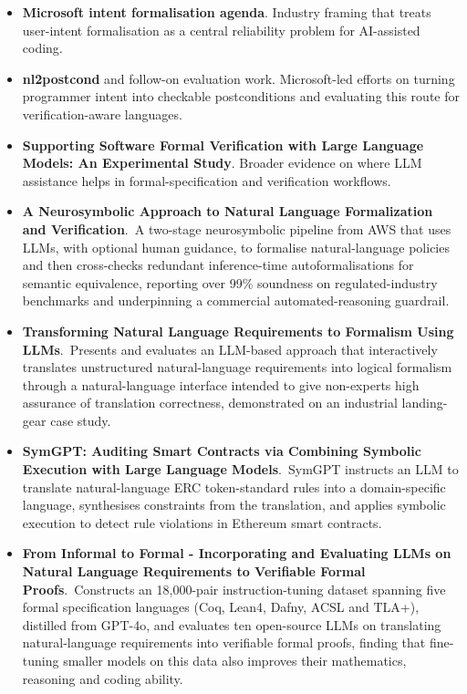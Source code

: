 \documentclass[natbib=false,acmsmall,nonacm,11pt]{acmart}
\begin{document}
\begin{itemize}
\item \textbf{Microsoft intent formalisation agenda}. Industry framing that treats user-intent formalisation as a central reliability problem for AI-assisted coding.~\cite{intent_formalization_grand_challenge_project}
\item \textbf{nl2postcond} and follow-on evaluation work. Microsoft-led efforts on turning programmer intent into checkable postconditions and evaluating this route for verification-aware languages.~\cite{DBLP:journals/pacmse/EndresFCL24,DBLP:conf/fmcad/Lahiri24}
\item \textbf{Supporting Software Formal Verification with Large Language Models: An Experimental Study}. Broader evidence on where LLM assistance helps in formal-specification and verification workflows.~\cite{DBLP:journals/corr/abs-2507-04857}
\item \textbf{A Neurosymbolic Approach to Natural Language Formalization and Verification}.~A two-stage neurosymbolic pipeline from AWS that uses LLMs, with optional human guidance, to formalise natural-language policies and then cross-checks redundant inference-time autoformalisations for semantic equivalence, reporting over 99\% soundness on regulated-industry benchmarks and underpinning a commercial automated-reasoning guardrail.~\cite{DBLP:conf/cav/AnBBCCCDDEFGGGHHHJKKKLL26}
\item \textbf{Transforming Natural Language Requirements to Formalism Using LLMs}.~Presents and evaluates an LLM-based approach that interactively translates unstructured natural-language requirements into logical formalism through a natural-language interface intended to give non-experts high assurance of translation correctness, demonstrated on an industrial landing-gear case study.~\cite{Meng_2025}
\item \textbf{SymGPT: Auditing Smart Contracts via Combining Symbolic Execution with Large Language Models}.~SymGPT instructs an LLM to translate natural-language ERC token-standard rules into a domain-specific language, synthesises constraints from the translation, and applies symbolic execution to detect rule violations in Ethereum smart contracts.~\cite{DBLP:journals/pacmpl/XiaHSYZYS26}
\item \textbf{From Informal to Formal - Incorporating and Evaluating LLMs on Natural Language Requirements to Verifiable Formal Proofs}.~Constructs an 18,000-pair instruction-tuning dataset spanning five formal specification languages (Coq, Lean4, Dafny, ACSL and TLA+), distilled from GPT-4o, and evaluates ten open-source LLMs on translating natural-language requirements into verifiable formal proofs, finding that fine-tuning smaller models on this data also improves their mathematics, reasoning and coding ability.~\cite{cao-etal-2025-informal}

\end{itemize}
\end{document}

